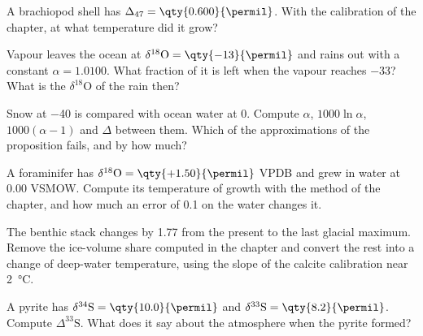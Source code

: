 \begin{exercise}[$\star$]\label{exo:b3:stable-isotopes:4}
A brachiopod shell has $\Delta_{47} = \qty{0.600}{\permil}$. With the calibration
of the chapter, at what temperature did it grow?
\end{exercise}

\begin{exercise}[$\star\star$]\label{exo:b3:stable-isotopes:5}
Vapour leaves the ocean at $\delta^{18}\mathrm O = \qty{-13}{\permil}$ and rains
out with a constant $\alpha = 1.0100$. What fraction of it is left when the
vapour reaches \qty{-33}{\permil}? What is the $\delta^{18}\mathrm O$ of the rain
then?
\end{exercise}

\begin{exercise}[$\star\star$]\label{exo:b3:stable-isotopes:6}
Snow at \qty{-40}{\permil} is compared with ocean water at 0. Compute $\alpha$,
$1000\ln\alpha$, $1000(\alpha - 1)$ and $\Delta$ between them. Which of the
approximations of the proposition fails, and by how much?
\end{exercise}

\begin{exercise}[$\star\star$]\label{exo:b3:stable-isotopes:7}
A foraminifer has $\delta^{18}\mathrm O = \qty{+1.50}{\permil}$ VPDB and grew in
water at \qty{0.00}{\permil} VSMOW. Compute its temperature of growth with the
method of the chapter, and how much an error of \qty{0.1}{\permil} on the water
changes it.
\end{exercise}

\begin{exercise}[$\star\star$]\label{exo:b3:stable-isotopes:8}
The benthic stack changes by \qty{1.77}{\permil} from the present to the last
glacial maximum. Remove the ice-volume share computed in the chapter and
convert the rest into a change of deep-water temperature, using the slope of
the calcite calibration near \qty{2}{\celsius}.
\end{exercise}

\begin{exercise}[$\star\star$]\label{exo:b3:stable-isotopes:9}
A pyrite has $\delta^{34}\mathrm S = \qty{10.0}{\permil}$ and $\delta^{33}\mathrm S =
\qty{8.2}{\permil}$. Compute $\Delta^{33}\mathrm S$. What does it say about the
atmosphere when the pyrite formed?
\end{exercise}


